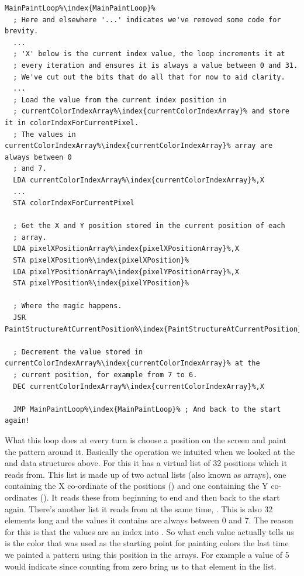\begin{lstlisting}[escapechar=\%]
MainPaintLoop%\index{MainPaintLoop}%   
  ; Here and elsewhere '...' indicates we've removed some code for brevity.
  ... 
  ; 'X' below is the current index value, the loop increments it at
  ; every iteration and ensures it is always a value between 0 and 31. 
  ; We've cut out the bits that do all that for now to aid clarity.
  ...
  ; Load the value from the current index position in
  ; currentColorIndexArray%\index{currentColorIndexArray}% and store it in colorIndexForCurrentPixel.
  ; The values in currentColorIndexArray%\index{currentColorIndexArray}% array are always between 0 
  ; and 7. 
  LDA currentColorIndexArray%\index{currentColorIndexArray}%,X
  ...
  STA colorIndexForCurrentPixel

  ; Get the X and Y position stored in the current position of each
  ; array.
  LDA pixelXPositionArray%\index{pixelXPositionArray}%,X
  STA pixelXPosition%\index{pixelXPosition}%
  LDA pixelYPositionArray%\index{pixelYPositionArray}%,X
  STA pixelYPosition%\index{pixelYPosition}%

  ; Where the magic happens.
  JSR PaintStructureAtCurrentPosition%\index{PaintStructureAtCurrentPosition}%

  ; Decrement the value stored in currentColorIndexArray%\index{currentColorIndexArray}% at the
  ; current position, for example from 7 to 6.
  DEC currentColorIndexArray%\index{currentColorIndexArray}%,X

  JMP MainPaintLoop%\index{MainPaintLoop}% ; And back to the start again!
\end{lstlisting}

What this loop does at every turn is choose a position on the screen and paint the pattern around it. Basically the operation we intuited
when we looked at the  and  data structures above. For this it has a virtual list of
32 positions which it reads from. This list is made up of two actual lists (also known as arrays), one containing the X co-ordinate
of the positions () and one containing the Y co-ordinates (). It reads these
from beginning to end and then back to the start again. There's another list it reads from at the same time, .
This is also 32 elements long and the values it contains are always between 0 and 7. The reason for this is that the values
are an index into . So
what each value actually tells us is the color that was used as the starting point for painting colors the last time we painted a pattern
using this position in the arrays. For example a value of 5 would indicate  since counting from zero bring us to that element
in the list.

